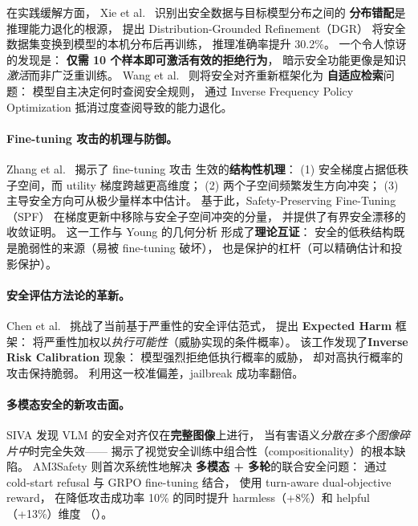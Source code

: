 在实践缓解方面，
Xie et al.\ \cite{xie2026dgr} 识别出安全数据与目标模型分布之间的
\textbf{分布错配}是推理能力退化的根源，
提出 Distribution-Grounded Refinement（DGR）
将安全数据集变换到模型的本机分布后再训练，
推理准确率提升 30.2\%。
一个令人惊讶的发现是：
\textbf{仅需 10 个样本即可激活有效的拒绝行为}，
暗示安全功能更像是知识\emph{激活}而非广泛重训练。
Wang et al.\ \cite{wang2026ascl} 则将安全对齐重新框架化为
\textbf{自适应检索}问题：
模型自主决定何时查阅安全规则，
通过 Inverse Frequency Policy Optimization 抵消过度查阅导致的能力退化。

\paragraph{Fine-tuning 攻击的机理与防御。}
Zhang et al.\ \cite{zhang2026spf} 揭示了
fine-tuning 攻击 \cite{qi2023finetuning} 生效的\textbf{结构性机理}：
(1) 安全梯度占据低秩子空间，而 utility 梯度跨越更高维度；
(2) 两个子空间频繁发生方向冲突；
(3) 主导安全方向可从极少量样本中估计。
基于此，Safety-Preserving Fine-Tuning（SPF）
在梯度更新中移除与安全子空间冲突的分量，
并提供了有界安全漂移的收敛证明。
这一工作与 Young \cite{young2026alignmenttax} 的几何分析
形成了\textbf{理论互证}：
安全的低秩结构既是脆弱性的来源（易被 fine-tuning 破坏），
也是保护的杠杆（可以精确估计和投影保护）。

\paragraph{安全评估方法论的革新。}
Chen et al.\ \cite{chen2026expectedharm} 挑战了当前基于严重性的安全评估范式，
提出 \textbf{Expected Harm} 框架：
将严重性加权以\emph{执行可能性}（威胁实现的条件概率）。
该工作发现了\textbf{Inverse Risk Calibration} 现象：
模型强烈拒绝低执行概率的威胁，
却对高执行概率的攻击保持脆弱。
利用这一校准偏差，jailbreak 成功率翻倍。

\paragraph{多模态安全的新攻击面。}
SIVA \cite{rashid2026siva} 发现 VLM 的安全对齐仅在\textbf{完整图像}上进行，
当有害语义\emph{分散在多个图像碎片中}时完全失效——
揭示了视觉安全训练中组合性（compositionality）的根本缺陷。
AM3Safety \cite{zhu2026am3safety} 则首次系统性地解决
\textbf{多模态 + 多轮}的联合安全问题：
通过 cold-start refusal 与 GRPO fine-tuning 结合，
使用 turn-aware dual-objective reward，
在降低攻击成功率 10\% 的同时提升 harmless（+8\%）和 helpful（+13\%）维度
（）。

